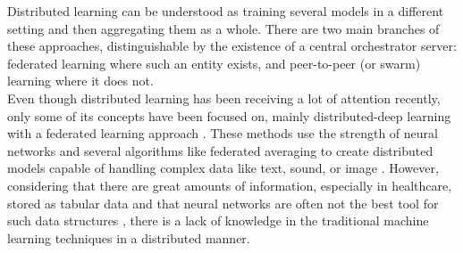 Distributed learning \cite{distributed} can be understood as training several models in a different setting and then aggregating them as a whole. There are two main branches of these approaches, distinguishable by the existence of a central orchestrator server: federated learning where such an entity exists, and peer-to-peer (or swarm) \cite{swarm_learning} learning where it does not. \\

Even though distributed learning has been receiving a lot of attention recently, only some of its concepts have been focused on, mainly distributed-deep learning with a federated learning approach \cite{xuFederatedLearningHealthcare2021,leeFederatedLearningClinical2020}. These methods use the strength of neural networks and several algorithms like federated averaging to create distributed models capable of handling complex data like text, sound, or image \cite{prayitnoSystematicReviewFederated2021}. However, considering that there are great amounts of information, especially in healthcare, stored as tabular data \cite{alvarezsanchezTAQIHToolTabular2019,dimartinoExplainableAIClinical2022,payrovnaziriExplainableArtificialIntelligence2020} and that neural networks are often not the best tool for such data structures \cite{borisovDeepNeuralNetworks2022a}, there is a lack of knowledge in the traditional machine learning techniques in a distributed manner.


